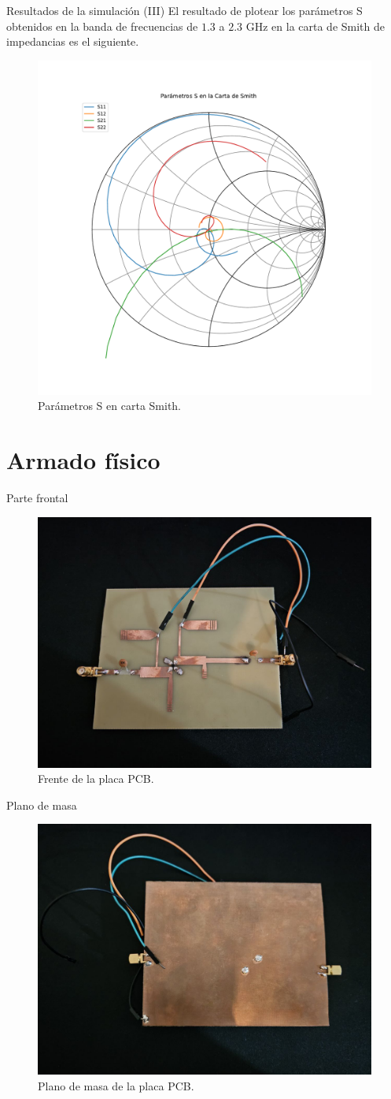 \documentclass[9pt]{beamer}
\begin{document}
	\begin{frame}{Resultados de la simulación (III)}
		El resultado de plotear los parámetros S obtenidos en la banda de frecuencias de $1.3$ a $2.3$ GHz en la carta de Smith de impedancias es el siguiente.
		\begin{figure}
			\centering
			\includegraphics[width=0.5\linewidth]{../s_smith}
			\caption{Parámetros S en carta Smith.}
			\label{fig:ssmith}
		\end{figure}
		
	\end{frame}
	
	\section{Armado físico}
	
	\begin{frame}{Parte frontal}
		\begin{figure}
			\centering
			\includegraphics[width=0.7\linewidth]{../frente}
			\caption{Frente de la placa PCB.}
			\label{fig:frente}
		\end{figure}
	\end{frame}
	
	\begin{frame}{Plano de masa}
		\begin{figure}
			\centering
			\includegraphics[width=0.7\linewidth]{../masa}
			\caption{Plano de masa de la placa PCB.}
			\label{fig:masa}
		\end{figure}
	\end{frame}
	
\end{document}

